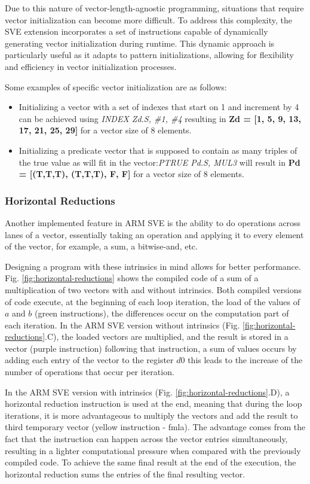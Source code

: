 Due to this nature of vector-length-agnostic programming, situations that require vector initialization can become more difficult. To address this complexity, the SVE extension incorporates a set of instructions capable of dynamically generating vector initialization during runtime. This dynamic approach is particularly useful as it adapts to pattern initializations, allowing for flexibility and efficiency in vector initialization processes.

Some examples of specific vector initialization are as follows:
\begin{itemize}
    \item Initializing a vector with a set of indexes that start on 1 and increment by 4 can be achieved using \textit{INDEX Zd.S, \#1, \#4} resulting in \textbf{Zd = [1, 5, 9, 13, 17, 21, 25, 29]} for a vector size of 8 elements.
    \item Initializing a predicate vector that is supposed to contain as many triples of the true value as will fit in the vector:\textit{PTRUE Pd.S, MUL3} will result in  \textbf{Pd = [(T,T,T), (T,T,T), F, F]} for a vector size of 8 elements.
\end{itemize}

\subsubsection{Horizontal Reductions}

Another implemented feature in ARM SVE is the ability to do operations across lanes of a vector, essentially taking an operation and applying it to every element of the vector, for example, a sum, a bitwise-and, etc. 

Designing a program with these intrinsics in mind allows for better performance. Fig. \ref{fig:horizontal-reductions} shows the compiled code of a sum of a multiplication of two vectors with and without intrinsics. Both compiled versions of code execute, at the beginning of each loop iteration, the load of the values of $a$ and $b$ (green instructions), the differences occur on the computation part of each iteration. In the ARM SVE version without intrinsics (Fig. \ref{fig:horizontal-reductions}.C), the loaded vectors are multiplied, and the result is stored in a vector (purple instruction) following that instruction, a sum of values occurs by adding each entry of the vector to the register $d0$ this leads to the increase of the number of operations that occur per iteration.

In the ARM SVE version with intrinsics (Fig. \ref{fig:horizontal-reductions}.D), a horizontal reduction instruction is used at the end, meaning that during the loop iterations, it is more advantageous to multiply the vectors and add the result to third temporary vector (yellow instruction - fmla). The advantage comes from the fact that the instruction can happen across the vector entries simultaneously, resulting in a lighter computational pressure when compared with the previously compiled code. To achieve the same final result at the end of the execution, the horizontal reduction sums the entries of the final resulting vector.

